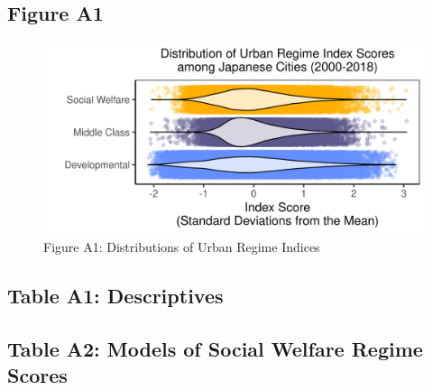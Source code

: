 \documentclass[preprint, 3p,
authoryear]{elsarticle} %
\begin{document}
\newpage

\hypertarget{figure_A1}{%
\subsection{Figure A1}\label{figure_A1}}

\begin{figure}
\includegraphics[width=1\linewidth]{viz/distribution} \caption{Figure A1: Distributions of Urban Regime Indices}\label{fig:figure_A1}
\end{figure}

\newpage

\hypertarget{table-a1-descriptives}{%
\subsection{Table A1: Descriptives}\label{table-a1-descriptives}}

\newpage
\begin{landscape}

\renewcommand{\baselinestretch}{0.5}\selectfont
\renewcommand{\arraystretch}{1.5}

\renewcommand{\arraystretch}{1}

\end{landscape}
\newpage

\hypertarget{table-a2-models-of-social-welfare-regime-scores}{%
\subsection{Table A2: Models of Social Welfare Regime
Scores}\label{table-a2-models-of-social-welfare-regime-scores}}
\end{document}
